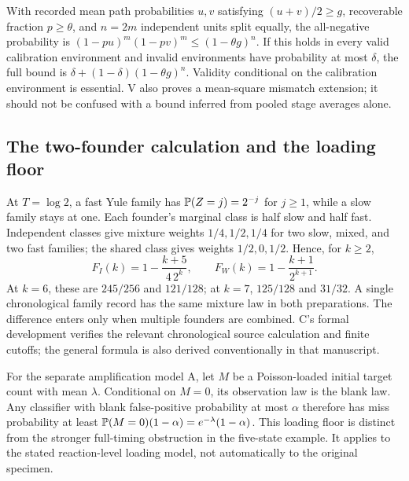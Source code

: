 With recorded mean path probabilities $u,v$ satisfying $(u+v)/2\ge g$, recoverable fraction $p\ge\theta$, and $n=2m$ independent units split equally, the all-negative probability is $(1-pu)^m(1-pv)^m\le(1-\theta g)^n$. If this holds in every valid calibration environment and invalid environments have probability at most $\delta$, the full bound is $\delta+(1-\delta)(1-\theta g)^n$. Validity conditional on the calibration environment is essential. V also proves a mean-square mismatch extension; it should not be confused with a bound inferred from pooled stage averages alone.

\subsection{The two-founder calculation and the loading floor}\label{app:counts}
At $T=\log2$, a fast Yule family has $\mathbb P(Z=j)=2^{-j}$ for $j\ge1$, while a slow family stays at one. Each founder's marginal class is half slow and half fast. Independent classes give mixture weights $1/4,1/2,1/4$ for two slow, mixed, and two fast families; the shared class gives weights $1/2,0,1/2$. Hence, for $k\ge2$,
\[
F_I(k)=1-\frac{k+5}{4\,2^k},\qquad
F_W(k)=1-\frac{k+1}{2^{k+1}}.
\]
At $k=6$, these are $245/256$ and $121/128$; at $k=7$, $125/128$ and $31/32$. A single chronological family record has the same mixture law in both preparations. The difference enters only when multiple founders are combined. C's formal development verifies the relevant chronological source calculation and finite cutoffs; the general formula is also derived conventionally in that manuscript.

For the separate amplification model A, let $M$ be a Poisson-loaded initial target count with mean $\lambda$. Conditional on $M=0$, its observation law is the blank law. Any classifier with blank false-positive probability at most $\alpha$ therefore has miss probability at least $\mathbb P(M=0)(1-\alpha)=e^{-\lambda}(1-\alpha)$. This loading floor is distinct from the stronger full-timing obstruction in the five-state example. It applies to the stated reaction-level loading model, not automatically to the original specimen.

